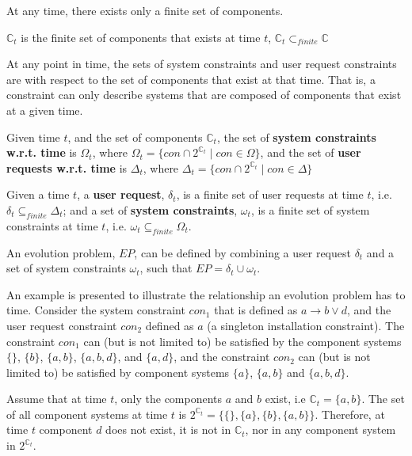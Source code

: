 At any time, there exists only a finite set of components. 
\begin{defs}
$\mathbb{C}_{t}$ is the finite set of components that exists at time $t$, $\mathbb{C}_{t} \subset_{finite} \mathbb{C}$
\end{defs}

At any point in time, the sets of system constraints and user request constraints are with respect to the set of components that exist at that time.
That is, a constraint can only describe systems that are composed of components that exist at a given time. 
\begin{defs}
Given time $t$, and the set of components $\mathbb{C}_{t}$, the set of \textbf{system constraints w.r.t. time} is $\Omega_{t}$, where $\Omega_{t} = \{con \cap 2^{\mathbb{C}_{t}} \mid con \in \Omega\}$,
and the set of \textbf{user requests w.r.t. time} is $\Delta_{t}$, where $\Delta_{t} = \{con \cap 2^{\mathbb{C}_{t}} \mid con \in \Delta\}$
\end{defs}

\begin{defs}
Given a time $t$, a \textbf{user request}, $\delta_{t}$, is a finite set of user requests at time $t$, i.e. $\delta_{t} \subseteq_{finite} \Delta_{t}$;
and a set of \textbf{system constraints}, $\omega_{t}$, is a finite set of system constraints at time $t$, i.e. $\omega_{t} \subseteq_{finite} \Omega_{t}$.  
\end{defs}

An evolution problem, $EP$, can be defined by combining a user request $\delta_{t}$ and a set of system constraints $\omega_{t}$, such that $EP = \delta_{t} \cup \omega_{t}$.


An example is presented to illustrate the relationship an evolution problem has to time.
Consider the system constraint $con_1$ that is defined as $a \rightarrow b \vee d$, and the user request constraint $con_2$ defined as $a$ (a singleton installation constraint).
The constraint $con_1$ can (but is not limited to) be satisfied by the component systems $\{\}$, $\{b\}$, $\{a,b\}$, $\{a,b,d\}$, and $\{a,d\}$,
and the constraint $con_2$ can (but is not limited to) be satisfied by component systems $\{a\}$, $\{a,b\}$ and $\{a,b,d\}$.

Assume that at time $t$, only the components $a$ and $b$ exist, i.e $\mathbb{C}_{t} = \{a,b\}$.
The set of all component systems at time $t$ is $2^{\mathbb{C}_{t}} = \{\{\},\{a\},\{b\},\{a,b\}\}$.
Therefore, at time $t$ component $d$ does not exist, it is not in $\mathbb{C}_{t}$, nor in any component system in $2^{\mathbb{C}_{t}}$.

